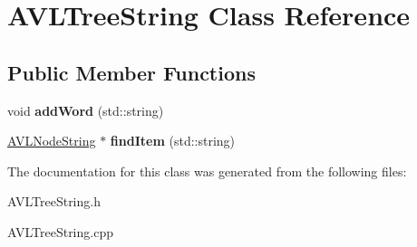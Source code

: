 \hypertarget{classAVLTreeString}{}\section{A\+V\+L\+Tree\+String Class Reference}
\label{classAVLTreeString}
\subsection*{Public Member Functions}
\begin{DoxyCompactItemize}
\item 
void {\bfseries add\+Word} (std\+::string)\hypertarget{classAVLTreeString_ac1bb599b821e5d823ec00aecf0f7ab31}{}\label{classAVLTreeString_ac1bb599b821e5d823ec00aecf0f7ab31}

\item 
\hyperlink{classAVLNodeString}{A\+V\+L\+Node\+String} $\ast$ {\bfseries find\+Item} (std\+::string)\hypertarget{classAVLTreeString_ae6c9c7c568ad7513446d2315d6a01906}{}\label{classAVLTreeString_ae6c9c7c568ad7513446d2315d6a01906}

\end{DoxyCompactItemize}


The documentation for this class was generated from the following files\+:\begin{DoxyCompactItemize}
\item 
A\+V\+L\+Tree\+String.\+h\item 
A\+V\+L\+Tree\+String.\+cpp\end{DoxyCompactItemize}
